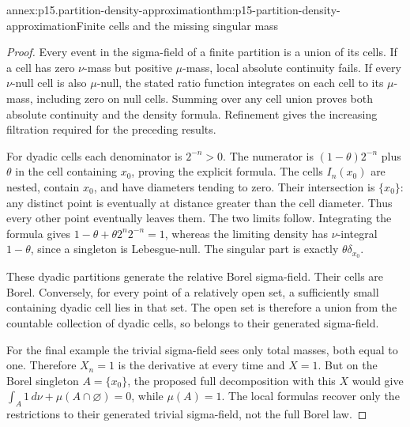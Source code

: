\begin{annexitem}{annex:p15.partition-density-approximation}{thm:p15-partition-density-approximation}{Finite cells and the missing singular mass}
\begin{proof}
Every event in the sigma-field of a finite partition is a union of its
cells. If a cell has zero \(\nu\)-mass but positive \(\mu\)-mass,
local absolute continuity fails. If every \(\nu\)-null cell is also
\(\mu\)-null, the stated ratio function integrates on each cell to
its \(\mu\)-mass, including zero on null cells.
Summing over any cell union proves both absolute continuity and the
density formula. Refinement gives the increasing filtration required
for the preceding results.

For dyadic cells each denominator is \(2^{-n}>0\).
The numerator is \((1-\theta)2^{-n}\) plus \(\theta\) in the cell
containing \(x_0\), proving the explicit formula.
The cells \(I_n(x_0)\) are nested, contain \(x_0\), and have diameters
tending to zero. Their intersection is \(\{x_0\}\): any distinct point
is eventually at distance greater than the cell diameter.
Thus every other point eventually leaves them. The two limits follow.
Integrating the formula gives
\(1-\theta+\theta2^n2^{-n}=1\), whereas the limiting density has
\(\nu\)-integral \(1-\theta\), since a singleton is Lebesgue-null.
The singular part is exactly \(\theta\delta_{x_0}\).

These dyadic partitions generate the relative Borel sigma-field.
Their cells are Borel. Conversely, for every point of a relatively
open set, a sufficiently small containing dyadic cell lies in that set.
The open set is therefore a union from the countable collection of
dyadic cells, so belongs to their generated sigma-field.

For the final example the trivial sigma-field sees only total masses,
both equal to one. Therefore \(X_n=1\) is the derivative at every
time and \(X=1\). But on the Borel singleton \(A=\{x_0\}\),
the proposed full decomposition with this \(X\) would give
\(\int_A1\,d\nu+\mu(A\cap\varnothing)=0\), while \(\mu(A)=1\).
The local formulas recover only the restrictions to their generated
trivial sigma-field, not the full Borel law.
\end{proof}
\end{annexitem}

